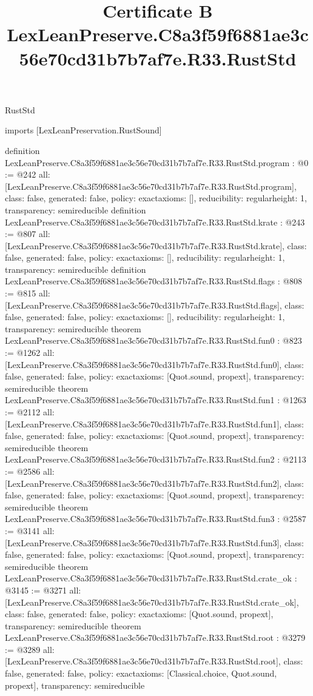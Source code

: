 \begin{lexlean}{RustStd}
\title{Certificate B LexLeanPreserve.C8a3f59f6881ae3c56e70cd31b7b7af7e.R33.RustStd}
\begin{coremodule}
imports [LexLeanPreservation.RustSound]

definition LexLeanPreserve.C8a3f59f6881ae3c56e70cd31b7b7af7e.R33.RustStd.program : @0 := @242 {
  all: [LexLeanPreserve.C8a3f59f6881ae3c56e70cd31b7b7af7e.R33.RustStd.program],
  class: false,
  generated: false,
  policy: exact{axioms: []},
  reducibility: regular{height: 1},
  transparency: semireducible
}
definition LexLeanPreserve.C8a3f59f6881ae3c56e70cd31b7b7af7e.R33.RustStd.krate : @243 := @807 {
  all: [LexLeanPreserve.C8a3f59f6881ae3c56e70cd31b7b7af7e.R33.RustStd.krate],
  class: false,
  generated: false,
  policy: exact{axioms: []},
  reducibility: regular{height: 1},
  transparency: semireducible
}
definition LexLeanPreserve.C8a3f59f6881ae3c56e70cd31b7b7af7e.R33.RustStd.flags : @808 := @815 {
  all: [LexLeanPreserve.C8a3f59f6881ae3c56e70cd31b7b7af7e.R33.RustStd.flags],
  class: false,
  generated: false,
  policy: exact{axioms: []},
  reducibility: regular{height: 1},
  transparency: semireducible
}
theorem LexLeanPreserve.C8a3f59f6881ae3c56e70cd31b7b7af7e.R33.RustStd.fun0 : @823 := @1262 {
  all: [LexLeanPreserve.C8a3f59f6881ae3c56e70cd31b7b7af7e.R33.RustStd.fun0],
  class: false,
  generated: false,
  policy: exact{axioms: [Quot.sound, propext]},
  transparency: semireducible
}
theorem LexLeanPreserve.C8a3f59f6881ae3c56e70cd31b7b7af7e.R33.RustStd.fun1 : @1263 := @2112 {
  all: [LexLeanPreserve.C8a3f59f6881ae3c56e70cd31b7b7af7e.R33.RustStd.fun1],
  class: false,
  generated: false,
  policy: exact{axioms: [Quot.sound, propext]},
  transparency: semireducible
}
theorem LexLeanPreserve.C8a3f59f6881ae3c56e70cd31b7b7af7e.R33.RustStd.fun2 : @2113 := @2586 {
  all: [LexLeanPreserve.C8a3f59f6881ae3c56e70cd31b7b7af7e.R33.RustStd.fun2],
  class: false,
  generated: false,
  policy: exact{axioms: [Quot.sound, propext]},
  transparency: semireducible
}
theorem LexLeanPreserve.C8a3f59f6881ae3c56e70cd31b7b7af7e.R33.RustStd.fun3 : @2587 := @3141 {
  all: [LexLeanPreserve.C8a3f59f6881ae3c56e70cd31b7b7af7e.R33.RustStd.fun3],
  class: false,
  generated: false,
  policy: exact{axioms: [Quot.sound, propext]},
  transparency: semireducible
}
theorem LexLeanPreserve.C8a3f59f6881ae3c56e70cd31b7b7af7e.R33.RustStd.crate_ok : @3145 := @3271 {
  all: [LexLeanPreserve.C8a3f59f6881ae3c56e70cd31b7b7af7e.R33.RustStd.crate_ok],
  class: false,
  generated: false,
  policy: exact{axioms: [Quot.sound, propext]},
  transparency: semireducible
}
theorem LexLeanPreserve.C8a3f59f6881ae3c56e70cd31b7b7af7e.R33.RustStd.root : @3279 := @3289 {
  all: [LexLeanPreserve.C8a3f59f6881ae3c56e70cd31b7b7af7e.R33.RustStd.root],
  class: false,
  generated: false,
  policy: exact{axioms: [Classical.choice, Quot.sound, propext]},
  transparency: semireducible
}


\end{coremodule}
\end{lexlean}
